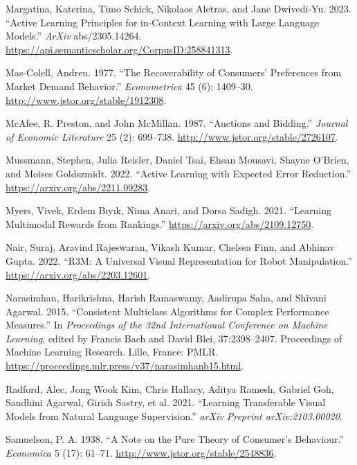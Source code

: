 \documentclass[
  letterpaper,
  numbers=noenddot,
  DIV=11]{scrreprt}
\newlength{\cslhangindent}
\newenvironment{CSLReferences}[2] %
 {\begin{list}{}{%
  \setlength{\itemindent}{0pt}
  \setlength{\leftmargin}{0pt}
  \setlength{\parsep}{0pt}
  \ifodd #1
   \setlength{\leftmargin}{\cslhangindent}
   \setlength{\itemindent}{-1\cslhangindent}
  \fi
  \setlength{\itemsep}{#2\baselineskip}}}
 {\end{list}}
\theoremstyle{plain}
\theoremstyle{definition}
\theoremstyle{plain}
\theoremstyle{remark}
\begin{document}
\begin{CSLReferences}{1}{0}
Margatina, Katerina, Timo Schick, Nikolaos Aletras, and Jane Dwivedi-Yu.
2023. {``Active Learning Principles for in-Context Learning with Large
Language Models.''} \emph{ArXiv} abs/2305.14264.
\url{https://api.semanticscholar.org/CorpusID:258841313}.

Mas-Colell, Andreu. 1977. {``The Recoverability of Consumers'
Preferences from Market Demand Behavior.''} \emph{Econometrica} 45 (6):
1409--30. \url{http://www.jstor.org/stable/1912308}.

McAfee, R. Preston, and John McMillan. 1987. {``Auctions and Bidding.''}
\emph{Journal of Economic Literature} 25 (2): 699--738.
\url{http://www.jstor.org/stable/2726107}.

Mussmann, Stephen, Julia Reisler, Daniel Tsai, Ehsan Mousavi, Shayne
O'Brien, and Moises Goldszmidt. 2022. {``Active Learning with Expected
Error Reduction.''} \url{https://arxiv.org/abs/2211.09283}.

Myers, Vivek, Erdem Bıyık, Nima Anari, and Dorsa Sadigh. 2021.
{``Learning Multimodal Rewards from Rankings.''}
\url{https://arxiv.org/abs/2109.12750}.

Nair, Suraj, Aravind Rajeswaran, Vikash Kumar, Chelsea Finn, and Abhinav
Gupta. 2022. {``R3M: A Universal Visual Representation for Robot
Manipulation.''} \url{https://arxiv.org/abs/2203.12601}.

Narasimhan, Harikrishna, Harish Ramaswamy, Aadirupa Saha, and Shivani
Agarwal. 2015. {``Consistent Multiclass Algorithms for Complex
Performance Measures.''} In \emph{Proceedings of the 32nd International
Conference on Machine Learning}, edited by Francis Bach and David Blei,
37:2398--2407. Proceedings of Machine Learning Research. Lille, France:
PMLR. \url{https://proceedings.mlr.press/v37/narasimhanb15.html}.

Radford, Alec, Jong Wook Kim, Chris Hallacy, Aditya Ramesh, Gabriel Goh,
Sandhini Agarwal, Girish Sastry, et al. 2021. {``Learning Transferable
Visual Models from Natural Language Supervision.''} \emph{arXiv Preprint
arXiv:2103.00020}.

Samuelson, P. A. 1938. {``A Note on the Pure Theory of Consumer's
Behaviour.''} \emph{Economica} 5 (17): 61--71.
\url{http://www.jstor.org/stable/2548836}.


\end{CSLReferences}
\end{document}
